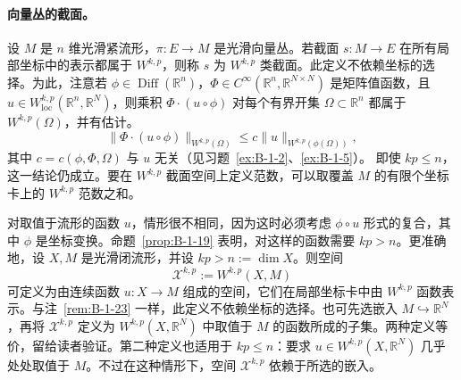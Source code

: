 \paragraph{向量丛的截面。}

\begin{remark}\label{rem:B-1-23}
设 $M$ 是 $n$ 维光滑紧流形，$\pi:E\to M$ 是光滑向量丛。若截面 $s:M\to E$ 在所有局部坐标中的表示都属于 $W^{k,p}$，则称 $s$ 为 $W^{k,p}$ 类截面。此定义不依赖坐标的选择。为此，注意若 $\phi\in\operatorname{Diff}(\mathbb R^n)$，$\Phi\in C^\infty(\mathbb R^n,\mathbb R^{N\times N})$ 是矩阵值函数，且 $u\in W_{\mathrm{loc}}^{k,p}(\mathbb R^n,\mathbb R^N)$，则乘积 $\Phi\cdot(u\circ\phi)$ 对每个有界开集 $\Omega\subset\mathbb R^n$ 都属于 $W^{k,p}(\Omega)$，并有估计。
\[
\|\Phi\cdot(u\circ\phi)\|_{W^{k,p}(\Omega)}
\le c\|u\|_{W^{k,p}(\phi(\Omega))},
\]
其中 $c=c(\phi,\Phi,\Omega)$ 与 $u$ 无关（见习题~\ref{ex:B-1-2}、\ref{ex:B-1-5}）。
即使 $kp\le n$，这一结论仍成立。要在 $W^{k,p}$ 截面空间上定义范数，可以取覆盖 $M$ 的有限个坐标卡上的 $W^{k,p}$ 范数之和。
\end{remark}

\begin{remark}\label{rem:B-1-24}
对取值于流形的函数 $u$，情形很不相同，因为这时必须考虑 $\phi\circ u$ 形式的复合，其中 $\phi$ 是坐标变换。命题~\ref{prop:B-1-19} 表明，对这样的函数需要 $kp>n$。更准确地，设 $X,M$ 是光滑闭流形，并设 $kp>n:=\dim X$。则空间
\[
\mathcal X^{k,p}:=W^{k,p}(X,M)
\]
可定义为由连续函数 $u:X\to M$ 组成的空间，它们在局部坐标卡中由 $W^{k,p}$ 函数表示。与注~\ref{rem:B-1-23} 一样，此定义不依赖坐标的选择。也可先选嵌入 $M\hookrightarrow\mathbb R^N$，再将 $\mathcal X^{k,p}$ 定义为 $W^{k,p}(X,\mathbb R^N)$ 中取值于 $M$ 的函数所成的子集。两种定义等价，留给读者验证。第二种定义也适用于 $kp\le n$：要求 $u\in W^{k,p}(X,\mathbb R^N)$ 几乎处处取值于 $M$。不过在这种情形下，空间 $\mathcal X^{k,p}$ 依赖于所选的嵌入。
\end{remark}
